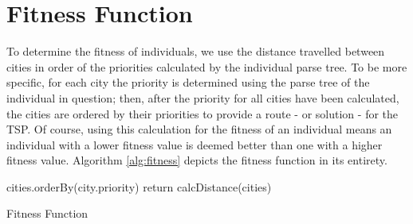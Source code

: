 \section{Fitness Function}\label{sec:fitness}
To determine the fitness of individuals, we use the distance travelled between cities in order of the priorities calculated by the individual parse tree. To be more specific, for each city the priority is determined using the parse tree of the individual in question; then, after the priority for all cities have been calculated, the cities are ordered by their priorities to provide a route - or solution - for the TSP. Of course, using this calculation for the fitness of an individual means an individual with a lower fitness value is deemed better than one with a higher fitness value. Algorithm \ref{alg:fitness} depicts the fitness function in its entirety.

\begin{algorithm}[H]\label{alg:fitness}
\SetAlgoLined
 \BlankLine
 cities.orderBy(city.priority)\;
 \BlankLine
 return calcDistance(cities)\;
 \caption{Fitness Function}
\end{algorithm}
